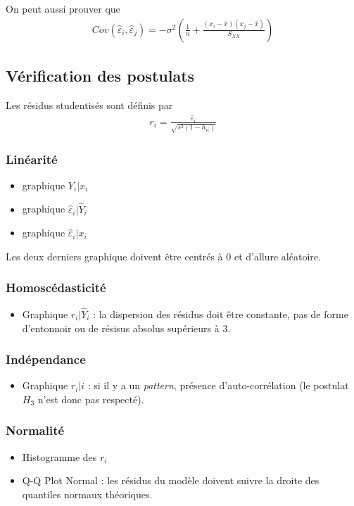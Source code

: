\documentclass[10pt, french]{article}
\begin{document}
\begin{multicols*}{3}
On peut aussi prouver que
\begin{align*}
Cov(\hat{\varepsilon}_i, \hat{\varepsilon}_j) = - \sigma^2 \left( \frac{1}{n} + \frac{(x_i - \bar{x})(x_j - \bar{x})}{S_{XX}} \right)
\end{align*}

\subsection*{Vérification des postulats}
Les résidus studentisés sont définis par
\begin{align*}
r_i = \frac{\hat{\varepsilon}_i}{\sqrt{s^2(1 - h_{ii})}}
\end{align*}
\subsubsection*{Linéarité}
\begin{itemize}
\item graphique $Y_i | x_i$
\item graphique $\hat{\varepsilon}_i | \hat{Y}_i$
\item graphique $\hat{\varepsilon}_i | x_i$
\end{itemize}
Les deux derniers graphique doivent être centrés à 0 et d'allure aléatoire.

\subsubsection*{Homoscédasticité}
\begin{itemize}
\item Graphique $r_i | \hat{Y}_i$ : la dispersion des résidus doit être constante, pas de forme d'entonnoir ou de résisus absolus supérieurs à 3.
\end{itemize}

\subsubsection*{Indépendance}
\begin{itemize}
\item Graphique $r_i|i$ : si il y a un \textit{pattern}, présence d'auto-corrélation (le postulat $H_3$ n'est donc pas respecté).
\end{itemize}

\subsubsection*{Normalité}
\begin{itemize}
\item Histogramme des $r_i$
\item Q-Q Plot Normal : les résidus du modèle doivent suivre la droite des quantiles normaux théoriques.
\end{itemize}





\end{multicols*}
\end{document}
